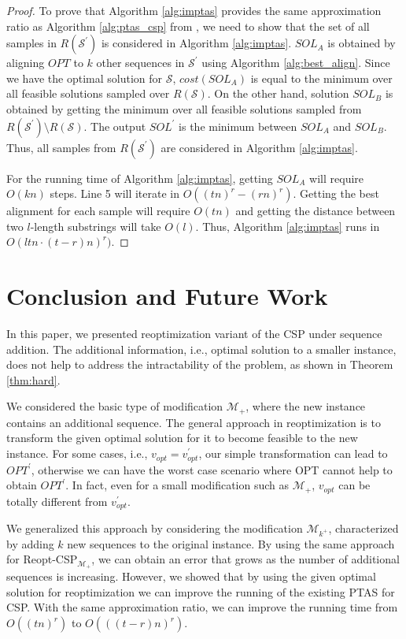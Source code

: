 \documentclass[journal]{acm_proc_article-sp}
\def\S{\ensuremath{\mathcal{S}}\xspace}
\def\Sp{\ensuremath{\mathcal{S}^\prime}\xspace}
\begin{document}
\begin{proof}
To prove that Algorithm \ref{alg:imptas} provides the same approximation ratio as Algorithm \ref{alg:ptas_csp}  from \cite{Li1999}, we need to show that the set of all samples in $R(\Sp)$ is considered in Algorithm \ref{alg:imptas}. $SOL_A$ is obtained by aligning  $OPT$ to $k$ other sequences in \Sp using Algorithm \ref{alg:best_align}. Since we have the optimal solution for \S, $cost(SOL_A)$  is equal to the minimum over all feasible solutions sampled over $R(\S)$. On the other hand,  solution $SOL_B$ is obtained by getting the minimum over all feasible solutions sampled from $R(\Sp) \setminus R(\S)$. The output $SOL^\prime$ is the minimum between $SOL_A$ and $SOL_B$. Thus, all samples from $R(\Sp)$ are considered   in Algorithm \ref{alg:imptas}.

For the running time of Algorithm \ref{alg:imptas}, getting $SOL_A$ will require $O(kn)$ steps. Line 5 will iterate in $O((tn)^r - (rn)^r)$.  Getting the best alignment for each sample will require $O(tn)$ and getting the distance between two $l$-length substrings will take $O(l)$. Thus, Algorithm \ref{alg:imptas} runs in $O(ltn\cdot (t-r)n)^{r})$.
\end{proof}

\section{Conclusion and Future Work}

In this paper, we presented reoptimization variant of the CSP under sequence addition. The additional information, i.e., optimal solution to a smaller instance, does not help to address the intractability of the problem, as shown in Theorem \ref{thm:hard}.

We considered the basic type of modification $\mathcal{M}_+$, where the new instance contains an additional sequence. The general approach in reoptimization is to transform the given optimal solution for it to become feasible to the new instance. For some cases, i.e., $v_{opt} = v^\prime_{opt}$, our simple transformation can lead to $OPT^\prime$, otherwise we can have the worst case scenario where OPT cannot help to obtain $OPT^\prime$. In fact, even for a small modification such as $\mathcal{M}_+$,  $v_{opt}$ can be totally different from $v^\prime_{opt}$.

We generalized this approach by considering the modification $\mathcal{M}_{k^+}$, characterized by adding $k$ new sequences to the original instance. By using the same approach for Reopt-CSP$_{\mathcal{M}_+}$, we can obtain an error that grows  as the number of additional sequences is increasing. However, we showed that by using the given optimal  solution for reoptimization we can improve the running of the existing PTAS for CSP. With the same approximation ratio, we can improve the running time from $O((tn)^r)$ to $O(((t-r)n)^r)$. 
\end{document}
